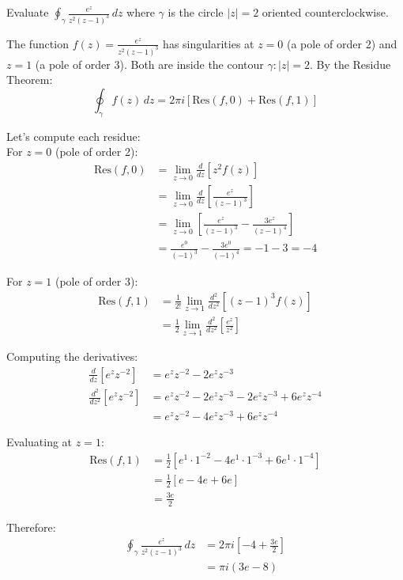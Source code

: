 \exampleline
\begin{example}
Evaluate $\oint_{\gamma} \frac{e^z}{z^2(z-1)^3} \, dz$ where $\gamma$ is the circle $|z| = 2$ oriented counterclockwise.

\begin{solution}
\noindent The function $f(z) = \frac{e^z}{z^2(z-1)^3}$ has singularities at $z = 0$ (a pole of order 2) and $z = 1$ (a pole of order 3). Both are inside the contour $\gamma: |z| = 2$. By the Residue Theorem:
\[
\oint_{\gamma} f(z) \, dz = 2\pi i [\text{Res}(f, 0) + \text{Res}(f, 1)]
\]

\noindent Let's compute each residue: \\

\noindent For $z = 0$ (pole of order 2):
\begin{align*}
\text{Res}(f, 0) &= \lim_{z \to 0} \frac{d}{dz} [z^2 f(z)] \\
&= \lim_{z \to 0} \frac{d}{dz} \left[\frac{e^z}{(z-1)^3}\right] \\
&= \lim_{z \to 0} \left[\frac{e^z}{(z-1)^3} - \frac{3e^z}{(z-1)^4}\right] \\
&= \frac{e^0}{(-1)^3} - \frac{3e^0}{(-1)^4} = -1 - 3 = -4
\end{align*}

\noindent For $z = 1$ (pole of order 3):
\begin{align*}
\text{Res}(f, 1) &= \frac{1}{2!} \lim_{z \to 1} \frac{d^2}{dz^2} [(z-1)^3 f(z)] \\
&= \frac{1}{2} \lim_{z \to 1} \frac{d^2}{dz^2} \left[\frac{e^z}{z^2}\right] 
\end{align*}

\noindent Computing the derivatives:
\begin{align*}
\frac{d}{dz} \left[e^z z^{-2}\right] &= e^z z^{-2} - 2e^z z^{-3} \\
\frac{d^2}{dz^2} \left[e^z z^{-2}\right] &= e^z z^{-2} - 2e^z z^{-3} - 2e^z z^{-3} + 6e^z z^{-4} \\
&= e^z z^{-2} - 4e^z z^{-3} + 6e^z z^{-4}
\end{align*}

\noindent Evaluating at $z = 1$:
\begin{align*}
\text{Res}(f, 1) &= \frac{1}{2}[e^1 \cdot 1^{-2} - 4e^1 \cdot 1^{-3} + 6e^1 \cdot 1^{-4}] \\
&= \frac{1}{2}[e - 4e + 6e] \\
&= \frac{3e}{2}
\end{align*}

\noindent Therefore:
\begin{align*}
\oint_{\gamma} \frac{e^z}{z^2(z-1)^3} \, dz &= 2\pi i \left[-4 + \frac{3e}{2}\right] \\
&= \pi i (3e - 8)
\end{align*}
\end{solution}
\end{example}
